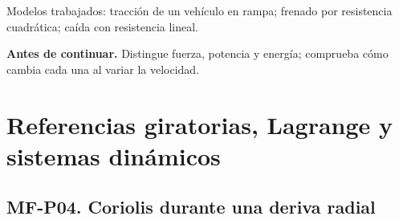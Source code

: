 \begin{tcolorbox}[studiumcheck,breakable=false,title={Síntesis y comprobación}]Modelos trabajados: tracción de un vehículo en rampa; frenado por resistencia cuadrática; caída con resistencia lineal.\par\textbf{Antes de continuar.} Distingue fuerza, potencia y energía; comprueba cómo cambia cada una al variar la velocidad.\end{tcolorbox}

\chapter{Referencias giratorias, Lagrange y sistemas dinámicos}


\Needspace{.30\textheight}\section{MF-P04. Coriolis durante una deriva radial}

